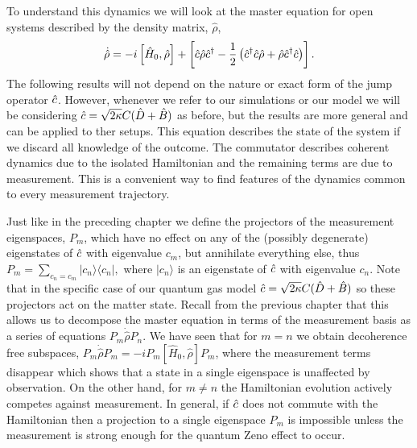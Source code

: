 To understand this dynamics we will look at the master equation for
open systems described by the density matrix, $\hat{\rho}$,
\begin{equation}
  \dot{\hat{\rho}} = -i \left[\hat{H}_0, \hat{\rho} \right] + 
  \left[ \hat{c} \hat{\rho} \hat{c}^\dagger - \frac{1}{2} \left( \hat{c}^\dagger \hat{c} \hat{\rho} + \hat{\rho}
      \hat{c}^\dagger \hat{c} \right) \right].
\end{equation}
The following results will not depend on the nature or exact form of
the jump operator $\hat{c}$. However, whenever we refer to our simulations
or our model we will be considering $\hat{c} = \sqrt{2 \kappa} C(\hat{D} + \hat{B})$
as before, but the results are more general and can be applied to ther
setups. This equation describes the state of the system if we discard
all knowledge of the outcome. The commutator describes coherent
dynamics due to the isolated Hamiltonian and the remaining terms are
due to measurement. This is a convenient way to find features of the
dynamics common to every measurement trajectory.

Just like in the preceding chapter we define the projectors of the
measurement eigenspaces, $P_m$, which have no effect on any of the
(possibly degenerate) eigenstates of $\hat{c}$ with eigenvalue $c_m$, but
annihilate everything else, thus
$P_m = \sum_{c_n = c_m} | c_n \rangle \langle c_n |,$ where
$| c_n \rangle$ is an eigenstate of $\hat{c}$ with eigenvalue $c_n$. Note
that in the specific case of our quantum gas model
$\hat{c} = \sqrt{2 \kappa} C(\hat{D} + \hat{B})$ so these projectors act on the
matter state. Recall from the previous chapter that this allows us to
decompose the master equation in terms of the measurement basis as a
series of equations $P_m \dot{\hat{\rho}} P_n$. We have seen that for
$m = n$ we obtain decoherence free subspaces,
$P_m \dot{\hat{\rho}} P_m = -i P_m \left[\hat{H}_0, \hat{\rho} \right]
P_m$, where the measurement terms disappear which shows that a state
in a single eigenspace is unaffected by observation. On the other
hand, for $m \ne n$ the Hamiltonian evolution actively competes
against measurement. In general, if $\hat{c}$ does not commute with the
Hamiltonian then a projection to a single eigenspace $P_m$ is
impossible unless the measurement is strong enough for the quantum
Zeno effect to occur.

